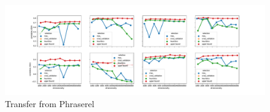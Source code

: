 \begin{figure}
  \centering
    \includegraphics[width=\textwidth]{supplement/figures/PhraseRel-transfer}
    \caption{Transfer from Phraserel}
    \label{fig:phraserel-transfer}
\end{figure}

